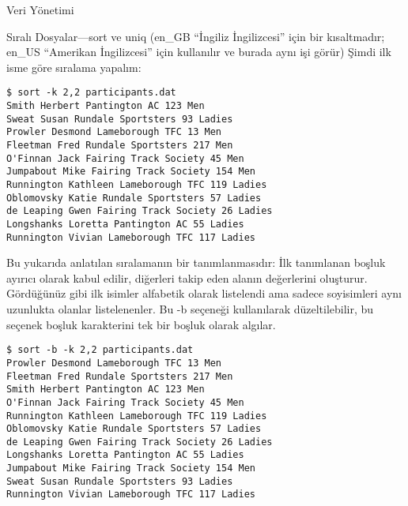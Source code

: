 \begin{section}{Veri Yönetimi}
\begin{subsection}{Sıralı Dosyalar—sort ve uniq}
(en\_GB “İngiliz İngilizcesi” için bir kısaltmadır; en\_US “Amerikan İngilizcesi” için kullanılır ve burada aynı işi görür) Şimdi ilk isme göre sıralama yapalım: 
\begin{verbatim}
$ sort -k 2,2 participants.dat
Smith Herbert Pantington AC 123 Men
Sweat Susan Rundale Sportsters 93 Ladies
Prowler Desmond Lameborough TFC 13 Men
Fleetman Fred Rundale Sportsters 217 Men
O'Finnan Jack Fairing Track Society 45 Men
Jumpabout Mike Fairing Track Society 154 Men
Runnington Kathleen Lameborough TFC 119 Ladies
Oblomovsky Katie Rundale Sportsters 57 Ladies
de Leaping Gwen Fairing Track Society 26 Ladies
Longshanks Loretta Pantington AC 55 Ladies
Runnington Vivian Lameborough TFC 117 Ladies
\end{verbatim}

Bu yukarıda anlatılan sıralamanın bir tanımlanmasıdır: İlk tanımlanan boşluk ayırıcı olarak kabul edilir, diğerleri takip eden alanın değerlerini oluşturur. Gördüğünüz gibi ilk isimler alfabetik olarak listelendi ama sadece soyisimleri aynı uzunlukta olanlar listelenenler. Bu -b seçeneği kullanılarak düzeltilebilir, bu seçenek boşluk karakterini tek bir boşluk olarak algılar.
\begin{verbatim}
$ sort -b -k 2,2 participants.dat
Prowler Desmond Lameborough TFC 13 Men
Fleetman Fred Rundale Sportsters 217 Men
Smith Herbert Pantington AC 123 Men
O'Finnan Jack Fairing Track Society 45 Men
Runnington Kathleen Lameborough TFC 119 Ladies
Oblomovsky Katie Rundale Sportsters 57 Ladies
de Leaping Gwen Fairing Track Society 26 Ladies
Longshanks Loretta Pantington AC 55 Ladies
Jumpabout Mike Fairing Track Society 154 Men
Sweat Susan Rundale Sportsters 93 Ladies
Runnington Vivian Lameborough TFC 117 Ladies
\end{verbatim}


\end{subsection}
\end{section}
